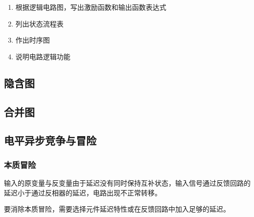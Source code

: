 \begin{enumerate}
    \item 根据逻辑电路图，写出激励函数和输出函数表达式
    \item 列出状态流程表
    \item 作出时序图
    \item 说明电路逻辑功能
\end{enumerate}

\subsection{隐含图}

\subsection{合并图}

\subsection{电平异步竞争与冒险}

\subsubsection{本质冒险}

输入的原变量与反变量由于延迟没有同时保持互补状态，输入信号通过反馈回路的延迟小于通过反相器的延迟，电路出现不正常转移。

要消除本质冒险，需要选择元件延迟特性或在反馈回路中加入足够的延迟。

\newpage
